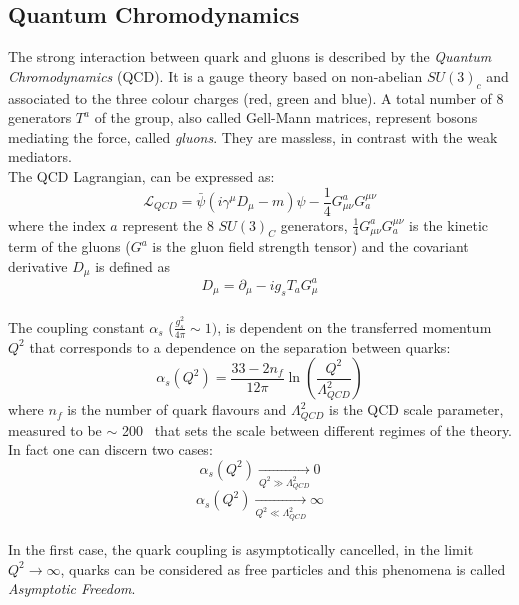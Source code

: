 \subsection{Quantum Chromodynamics} 

The strong interaction between quark and gluons is described by the \textit{Quantum Chromodynamics} (QCD). It is a gauge theory based on non-abelian 
$SU(3)_{c}$\footnotemark {}
and associated to the three colour charges (red, green and blue). A total number of 8 generators $T^a$ of the group, also called Gell-Mann matrices,
represent bosons mediating the force, called \textit{gluons}. They are massless, in contrast with the weak mediators.
\vspace{\baselineskip}
\\The QCD Lagrangian, can be expressed as:
\begin{equation}
\mathcal{L}_{QCD}  =  \bar{\psi}(i\gamma^{\mu}D_{\mu}-m)\psi-\frac{1}{4}G^{a}_{\mu\nu}G^{\mu\nu}_a
\end{equation}
where the index $a$ represent the 8 $SU(3)_C$ generators,  $\frac{1}{4}G^{a}_{\mu\nu}G^{\mu\nu}_a$ is the kinetic term of the gluons ($G^a$ is the gluon field strength tensor) and the covariant derivative $D_{\mu}$ is defined as
\begin{equation}
D_{\mu}=\partial_{\mu}-ig_{s}T_{a}G^{a}_{\mu}
\end{equation}
\vspace{\baselineskip}
\\The coupling constant $\alpha_{s}$ ($\frac{g^2_s}{4\pi}\sim 1)$, is dependent on the transferred momentum $Q^2$ that corresponds to a dependence on the separation between quarks:
\begin{equation}
\alpha_{s}(Q^2)= \frac{33-2n_f}{12\pi}   \ln\left( \frac{Q^2}{\Lambda^{2}_{QCD}}   \right)
\end{equation}
where $n_f$ is the number of quark flavours and $\Lambda^{2}_{QCD}$ is the QCD scale parameter, measured to be $\sim$ 200 \MeV $\,$ that sets the scale 
between different regimes of the theory. \\
In fact one can discern two cases:
\[\alpha_{s}(Q^2)\xrightarrow[Q^{2} \gg \Lambda^{2}_{QCD} ]{}0\]
\[\alpha_{s}(Q^2)\xrightarrow[Q^{2} \ll \Lambda^{2}_{QCD} ]{}\infty\]
\\In the first case, the quark coupling is asymptotically cancelled, in the limit $Q^{2}\rightarrow \infty$, quarks can be considered as free particles and this phenomena is called \textit{Asymptotic Freedom}.
